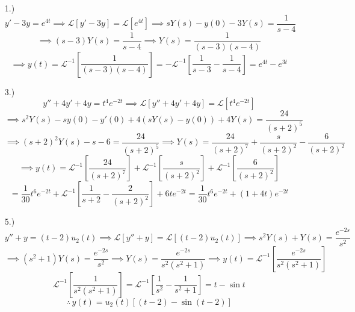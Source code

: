 \documentclass[12pt]{article}
\newcommand{\bracks}[1]{\left[#1\right]}
\newcommand{\lp}{\mathcal{L}}
\newcommand{\lpi}{\mathcal{L}^{-1}}
\begin{document}
\pagestyle{fancy}
\fancyhead{}

\normalsize
\begin{itemize}
    \item [1.)] \[y'-3y=e^{4t}\implies\lp\bracks{y'-3y}=\lp\bracks{e^{4t}}\implies sY(s)-y(0)-3Y(s)=\frac{1}{s-4}\]
    \[\implies (s-3)Y(s)=\frac{1}{s-4}\implies Y(s)=\frac{1}{(s-3)(s-4)}\]
    \[\implies y(t)=\lpi\bracks{\frac{1}{(s-3)(s-4)}}=-\lpi\bracks{\frac{1}{s-3}-\frac{1}{s-4}}=e^{4t}-e^{3t}\]

    \item [3.)] \[y''+4y'+4y=t^4e^{-2t}\implies\lp\bracks{y''+4y'+4y}=\lp\bracks{t^4e^{-2t}}\]
    \[\implies s^2Y(s)-s y(0)-y'(0)+4(sY(s)-y(0))+4Y(s)=\frac{24}{(s+2)^5}\]
    \[\implies (s+2)^2Y(s)-s-6=\frac{24}{(s+2)^5}\implies Y(s)=\frac{24}{(s+2)^7}+\frac{s}{(s+2)^2}-\frac{6}{(s+2)^2}\]
    \[\implies y(t)=\lpi\bracks{\frac{24}{(s+2)^7}}+\lpi\bracks{\frac{s}{(s+2)^2}}+\lpi\bracks{\frac{6}{(s+2)^2}}\]
    \[=\frac{1}{30}t^6e^{-2t}+\lpi\bracks{\frac{1}{s+2}-\frac{2}{(s+2)^2}}+6te^{-2t}=\frac{1}{30}t^6e^{-2t}+(1+4t)e^{-2t}\]

    \item [5.)] \[y''+y=(t-2)u_2(t)\implies\lp\bracks{y''+y}=\lp\bracks{(t-2)u_2(t)}\implies s^2Y(s)+Y(s)=\frac{e^{-2s}}{s^2}\]
    \[\implies (s^2+1)Y(s)=\frac{e^{-2s}}{s^2}\implies Y(s)=\frac{e^{-2s}}{s^2(s^2+1)}\implies y(t)=\lpi\bracks{\frac{e^{-2s}}{s^2(s^2+1)}}\]
    \[\lpi\bracks{\frac{1}{s^2(s^2+1)}}=\lpi\bracks{\frac{1}{s^2}-\frac{1}{s^2+1}}=t-\sin t\]
    \[\therefore\,y(t)=u_2(t)[(t-2)-\sin(t-2)]\]

\end{itemize}
\end{document}
